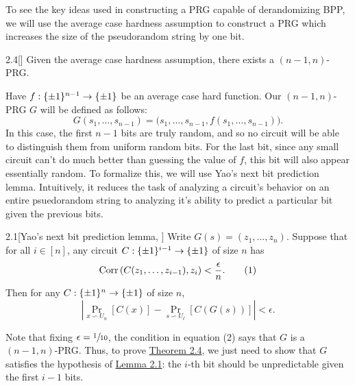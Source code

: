 \documentclass[11pt]{article}
\begin{document}
To see the key ideas used in constructing a PRG capable of derandomizing BPP, we will use the average case hardness assumption to construct a PRG which increases the size of the pseudorandom string by one bit.

\begin{theorem}{2.4}[\cite{NW94}]\label{t-2-4}
    Given the average case hardness assumption, there exists a $(n - 1, n)$-PRG.
\end{theorem}
\noindent
Have $f : \{\pm 1\}^{n - 1} \rightarrow \{\pm 1\}$ be an average case hard function. Our $(n - 1, n)$-PRG $G$ will be defined as follows:
\begin{equation*}
    G(s_1, \ldots, s_{n - 1}) = \bigl(s_1, \ldots, s_{n - 1}, f(s_1, \ldots, s_{n - 1})\bigr).
\end{equation*}
In this case, the first $n - 1$ bits are truly random, and so no circuit will be able to distinguish them from uniform random bits. For the last bit, since any small circuit can't do much better than guessing the value of $f$, this bit will also appear essentially random. To formalize this, we will use Yao's next bit prediction lemma. Intuitively, it reduces the task of analyzing a circuit's behavior on an entire psuedorandom string to analyzing it's ability to predict a particular bit given the previous bits.
\begin{lemma}{2.1}[Yao's next bit prediction lemma, \cite{Yao82}]\label{l-2-1}
    Write $G(s) = (z_1, \ldots, z_n)$. Suppose that for all $i \in [n]$, any circuit $C : \{\pm 1\}^{i - 1} \rightarrow \{\pm 1\}$ of size $n$ has 
    \begin{equation*}
        \mathrm{Corr}\left(C(z_1, \ldots, z_{i - 1}), z_i\right) < \frac{\epsilon}{n}. \tag{1}
    \end{equation*}
    Then for any $C : \{\pm 1\}^n \rightarrow \{\pm 1\}$ of size $n$, 
    \begin{equation*}
        \left|\Pr_{x \backsim U_n}[C(x)] - \Pr_{s \backsim U_\ell}[C(G(s))]\right| < \epsilon. \tag{2}
    \end{equation*}
\end{lemma}
Note that fixing $\epsilon = \sfrac{1}{10}$, the condition in equation (2) says that $G$ is a $(n - 1, n)$-PRG. Thus, to prove  \hyperref[t-2-4]{Theorem 2.4}, we just need to show that $G$ satisfies the hypothesis of \hyperref[l-2-1]{Lemma 2.1}: the $i$-th bit should be unpredictable given the first $i - 1$ bits.
\end{document}
